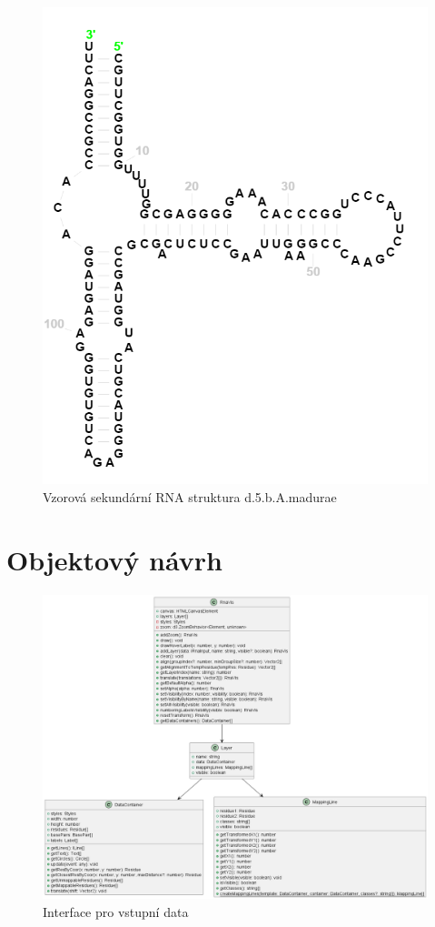 \begin{figure}[H]
  \centering
  \includegraphics[width=145mm]{../img/inputDataTemplate.png}
  \caption{Vzorová sekundární RNA struktura d.5.b.A.madurae}
\end{figure}


\section{Objektový návrh}

\begin{figure}[H]
  \centering
  \includegraphics[width=145mm]{../img/rnaVis.png}
  \caption{Interface pro vstupní data}
\end{figure}


